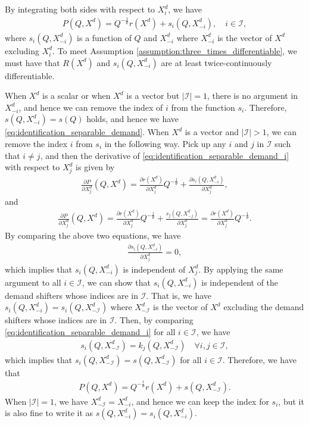 \documentclass[11pt, a4paper]{article}
\theoremstyle{remark}
\begin{document}
By integrating both sides with respect to $X^{d}_i$, we have
\begin{align}
    P(Q, X^{d}) = Q^{-\frac{1}{\theta}}r(X^{d}) + s_i(Q, X^{d}_{-i}), \quad i \in \mathcal{I}, \label{eq:identification_separable_demand_i}
\end{align}
where $s_i(Q, X^{d}_{-i})$ is a function of $Q$ and $X^{d}_{-i}$ where $X^{d}_{-i}$ is the vector of $X^{d}$ excluding $X^{d}_i$.
To meet Assumption \ref{assumption:three_times_differentiable}, we must have that $R(X^{d})$ and $s_i(Q, X^{d}_{-i})$ are at least twice-continuously differentiable.

When $X^{d}$ is a scalar or when $X^{d}$ is a vector but $|\mathcal{I}| = 1$, there is no argument in $X^{d}_{-i}$, and hence we can remove the index of $i$ from the function $s_i$.
Therefore, $s(Q, X^{d}_{-i}) = s(Q)$ holds, and hence we have \eqref{eq:identification_separable_demand}.
When $X^{d}$ is a vector and $|\mathcal{I}| > 1$, we can remove the index $i$ from $s_i$ in the following way.
Pick up any $i$ and $j$ in $\mathcal{I}$ such that $i \ne j$, and then the derivative of \eqref{eq:identification_separable_demand_i} with respect to $X^{d}_j$ is given by
\begin{align}
    \frac{\partial P}{\partial X^{d}_j}(Q, X^{d}) = \frac{\partial r(X^{d})}{\partial X^{d}_j} Q^{-\frac{1}{\theta}} + \frac{\partial s_i(Q, X^{d}_{-i})}{\partial X^{d}_j},
\end{align}
and
\begin{align}
    \frac{\partial P}{\partial X^{d}_j}(Q, X^{d}) = \frac{\partial r(X^{d})}{\partial X^{d}_j} Q^{-\frac{1}{\theta}} + \frac{s_j(Q, X^{d}_{-j})}{\partial X^{d}_j} = \frac{\partial r(X^{d})}{\partial X^{d}_j} Q^{-\frac{1}{\theta}}.
\end{align}
By comparing the above two equations, we have
\begin{align}
    \frac{\partial s_i(Q, X^{d}_{-i})}{\partial X^{d}_j} = 0,
\end{align} 
which implies that $s_i(Q, X^{d}_{-i})$ is independent of $X^{d}_j$.
By applying the same argument to all $i \in \mathcal{I}$, we can show that $s_i(Q, X^{d}_{-i})$ is independent of the demand shifters whose indices are in $\mathcal{I}$.
That is, we have $s_i(Q, X^{d}_{-i}) = s_i(Q, X^{d}_{-\mathcal{I}})$ where $X^{d}_{-\mathcal{I}}$ is the vector of $X^{d}$ excluding the demand shifters whose indices are in $\mathcal{I}$.
Then, by comparing \eqref{eq:identification_separable_demand_i} for all $i \in \mathcal{I}$, we have
\begin{align}
    s_i(Q, X^{d}_{-\mathcal{I}}) = k_j(Q, X^{d}_{-\mathcal{I}}) \quad \forall i,j \in \mathcal{I},
\end{align}
which implies that $s_i(Q, X^{d}_{-\mathcal{I}}) = s(Q, X^{d}_{-\mathcal{I}})$ for all $i \in \mathcal{I}$.
Therefore, we have that
\begin{align}
    P(Q, X^{d}) = Q^{-\frac{1}{\theta}}r(X^{d}) + s(Q, X^{d}_{-\mathcal{I}}).
\end{align}
When $|\mathcal{I}| = 1$, we have $X^{d}_{-\mathcal{I}} = X^{d}_{-i}$, and hence we can keep the index for $s_i$, but it is also fine to write it as $s(Q, X^{d}_{-i}) = s_i(Q, X^{d}_{-i})$.
\end{document}
